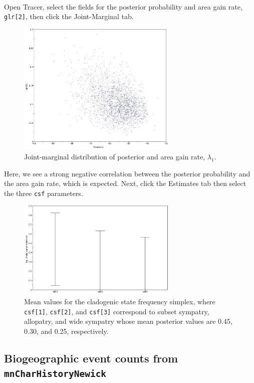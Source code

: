 \noindent \\ \impmark Open Tracer, select the fields for the posterior probability and area gain rate, {\tt glr[2]}, then click the Joint-Marginal tab.

\begin{figure}[H]
\centering
\includegraphics[width=3in]{figures/joint_rgain_posterior}
\caption{Joint-marginal distribution of posterior and area gain rate, $\lambda_1$.}
\end{figure}

Here, we see a strong negative correlation between the posterior probability and the area gain rate, which is expected.
Next, click the Estimates tab then select the three {\tt csf} parameters.

\begin{figure}[H]
\centering
\includegraphics[width=3in]{figures/clado_freq_posterior}
\caption{Mean values for the cladogenic state frequency simplex, where {\tt csf[1]}, {\tt csf[2]}, and {\tt csf[3]} correspond to subset sympatry, allopatry, and wide sympatry whose mean posterior values are 0.45, 0.30, and 0.25, respectively.}
\end{figure}


\subsection{Biogeographic event counts from {\tt mnCharHistoryNewick}}


